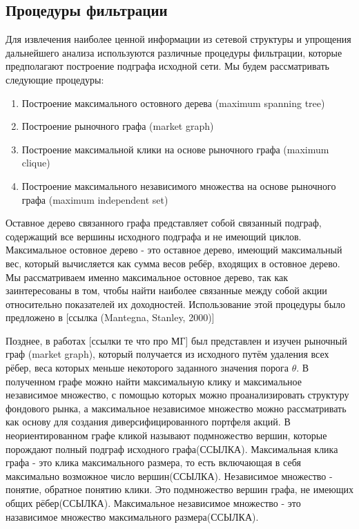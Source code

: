 \subsection{Процедуры фильтрации}

Для извлечения наиболее ценной информации из сетевой структуры и упрощения дальнейшего анализа используются различные процедуры фильтрации, которые предполагают построение подграфа исходной сети. Мы будем рассматривать следующие процедуры:

\begin{enumerate}
	\item Построение максимального остовного дерева (maximum spanning tree)
	\item Построение рыночного графа (market graph)
	\item Построение максимальной клики на основе рыночного графа (maximum clique)
	\item Построение максимального независимого множества на основе рыночного графа (maximum independent set)
\end{enumerate}

Оставное дерево связанного графа представляет собой связанный подграф, содержащий все вершины исходного подграфа и не имеющий циклов.  Максимальное остовное дерево - это оставное дерево, имеющий максимальный вес, который вычисляется как сумма весов ребёр, входящих в остовное дерево. Мы рассматриваем именно максимальное остовное дерево, так как заинтересованы в том, чтобы найти наиболее связанные между собой акции относительно показателей их доходностей. Использование этой процедуры было предложено в [ссылка (Mantegna, Stanley, 2000)]

Позднее, в работах  [ссылки те что про МГ] был представлен и изучен рыночный граф (market graph), который получается из исходного путём удаления всех рёбер, веса которых меньше некоторого заданного значения порога $\theta$. В полученном графе можно найти максимальную клику и максимальное независимое множество, с помощью которых можно проанализировать структуру фондового рынка, а максимальное независимое множество можно рассматривать как основу для создания диверсифицированного портфеля акций. В неориентированном графе кликой называют подмножество вершин, которые порождают полный подграф исходного графа(ССЫЛКА). Максимальная клика графа - это клика максимального размера, то есть включающая в себя максимально возможное число вершин(ССЫЛКА). Независимое множество - понятие, обратное понятию клики. Это подмножество вершин графа, не имеющих общих рёбер(ССЫЛКА). Максимальное независимое множество - это назависимое множество максимального размера(ССЫЛКА).

